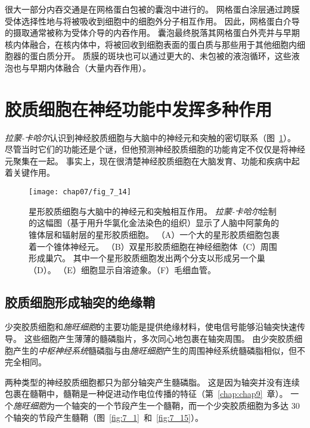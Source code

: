 很大一部分内吞交通是在网格蛋白包被的囊泡中进行的。 
网格蛋白涂层通过跨膜受体选择性地与将被吸收到细胞中的细胞外分子相互作用。
因此，网格蛋白介导的摄取通常被称为受体介导的内吞作用。
囊泡最终脱落其网格蛋白外壳并与早期核内体融合，在核内体中，将被回收到细胞表面的蛋白质与那些用于其他细胞内细胞器的蛋白质分开。
质膜的斑块也可以通过更大的、未包被的液泡循环，这些液泡也与早期内体融合（大量内吞作用）。



\section{胶质细胞在神经功能中发挥多种作用}

\textit{拉蒙-卡哈尔}认识到神经胶质细胞与大脑中的神经元和突触的密切联系（图~\ref{fig:7_14}）。
尽管当时它们的功能还是个谜，但他预测神经胶质细胞的功能肯定不仅仅是将神经元聚集在一起。
事实上，现在很清楚神经胶质细胞在大脑发育、功能和疾病中起着关键作用。


\begin{figure}[htbp]
	\centering
	\texttt{[image: chap07/fig\_7\_14]}
	\caption{星形胶质细胞与大脑中的神经元和突触相互作用。
		\textit{拉蒙-卡哈尔}绘制的这幅图（基于用升华氯化金法染色的组织）显示了人脑中阿蒙角的锥体层和辐射层的星形胶质细胞。
		（A）一个大的星形胶质细胞包裹着一个锥体神经元。
		（B）双星形胶质细胞在神经细胞体（C）周围形成巢穴。
		其中一个星形胶质细胞发出两个分支以形成另一个巢（D）。 
		（E）细胞显示自溶迹象。（F）毛细血管。 }
	\label{fig:7_14}
\end{figure}



\subsection{胶质细胞形成轴突的绝缘鞘}

少突胶质细胞和\textit{施旺细胞}的主要功能是提供绝缘材料，使电信号能够沿轴突快速传导。
这些细胞产生薄薄的髓磷脂片，多次同心地包裹在轴突周围。
由少突胶质细胞产生的\textit{中枢神经系统}髓磷脂与由\textit{施旺细胞}产生的周围神经系统髓磷脂相似，但不完全相同。


两种类型的神经胶质细胞都只为部分轴突产生髓磷脂。
这是因为轴突并没有连续包裹在髓鞘中，髓鞘是一种促进动作电位传播的特征（第~\ref{chap:chap9}~章）。 
一个\textit{施旺细胞}为一个轴突的一个节段产生一个髓鞘，而一个少突胶质细胞为多达 30 个轴突的节段产生髓鞘（图~\ref{fig:7_1}~和~\ref{fig:7_15}）。


